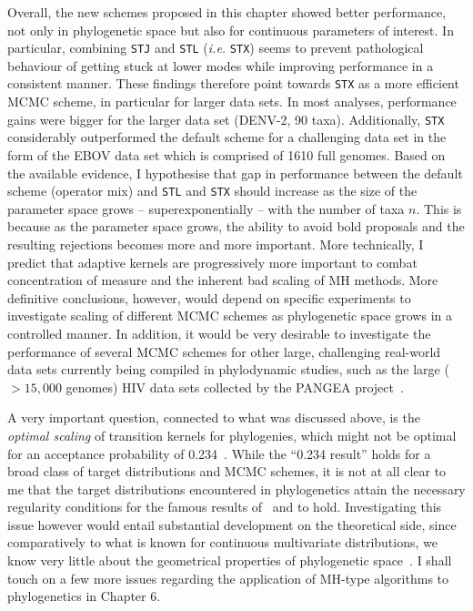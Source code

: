 Overall, the new schemes proposed in this chapter showed better performance, not only in phylogenetic space but also for continuous parameters of interest.
In particular, combining \verb|STJ| and \verb|STL| (\textit{i.e.} \verb|STX|) seems to prevent pathological behaviour of getting stuck at lower modes while improving performance in a consistent manner.
These findings therefore point towards \verb|STX| as a more efficient MCMC scheme, in particular for larger data sets.
In most analyses, performance gains were bigger for the larger data set (DENV-2, 90 taxa).
Additionally, \verb|STX| considerably outperformed the default scheme for a challenging data set in the form of the EBOV data set which is comprised of 1610 full genomes.
Based on the available evidence, I hypothesise that gap in performance between the default scheme (operator mix) and \verb|STL| and \verb|STX| should increase as the size of the parameter space grows -- superexponentially -- with the number of taxa $n$.
This is because as the parameter space grows, the ability to avoid bold proposals and the resulting rejections becomes more and more important.
More technically, I predict that adaptive kernels are progressively more important to combat concentration of measure and the inherent bad scaling of MH methods.
More definitive conclusions, however, would depend on specific experiments to investigate scaling of different MCMC schemes as phylogenetic space grows in a controlled manner.
In addition, it would be very desirable to investigate the performance of several MCMC schemes for other large, challenging real-world data sets currently being compiled in phylodynamic studies, such as the large ($>15, 000$ genomes) HIV data sets collected by the PANGEA project~\citep{Pillay2015}.

A very important question, connected to what was discussed above, is the \textit{optimal scaling} of transition kernels for phylogenies, which might not be optimal for an acceptance probability of 0.234~\citep{Potter2015}.
While the ``0.234 result'' holds for a broad class of target distributions and MCMC schemes, it is not at all clear to me that the target distributions encountered in phylogenetics attain the necessary regularity conditions for the famous results of~\cite{Gelman1996} and \cite{Roberts1998} to hold.
Investigating this issue however would entail substantial development on the theoretical side, since comparatively to what is known for continuous multivariate distributions, we know very little about the geometrical properties of phylogenetic space~\citep{Gavryushkin2016, StJohn2017,Whidden2017}.
I shall touch on a few more issues regarding the application of MH-type algorithms to phylogenetics in Chapter 6.

